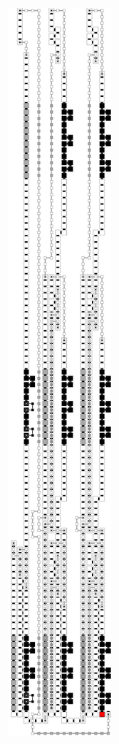 \begin{figure}[H]
\begin{subfigure}[t]{0.3\textwidth}
    \end{subfigure}%
    ~
    \begin{subfigure}[t]{0.3\textwidth}
        \centering
        \includegraphics[width=0.3\textwidth]{seed/seed_overview_case2}

\end{subfigure}
\end{figure}
